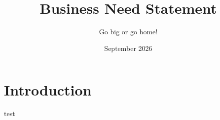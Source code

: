 \documentclass{article}
\title{Business Need Statement}
\author{Go big or go home!}
\date{September 2026}
\begin{document}
\maketitle

\section{Introduction}

test
\end{document}
